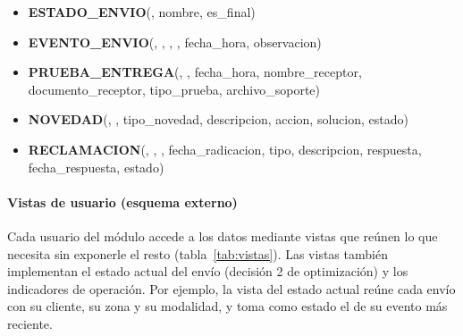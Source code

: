 {\begin{itemize}[leftmargin=0.6cm,itemsep=3pt,label={}]
  \item \textbf{ESTADO\_ENVIO}(, nombre, es\_final)
  \item \textbf{EVENTO\_ENVIO}(, , , , fecha\_hora, observacion)
  \item \textbf{PRUEBA\_ENTREGA}(, , fecha\_hora, nombre\_receptor, documento\_receptor, tipo\_prueba, archivo\_soporte)
  \item \textbf{NOVEDAD}(, , tipo\_novedad, descripcion, accion, solucion, estado)
  \item \textbf{RECLAMACION}(, , , fecha\_radicacion, tipo, descripcion, respuesta, fecha\_respuesta, estado)
\end{itemize}
\par}

\paragraph{Vistas de usuario (esquema externo)}

Cada usuario del módulo accede a los datos mediante vistas que reúnen lo
que necesita sin exponerle el resto (tabla~\ref{tab:vistas}). Las vistas
también implementan el estado actual del envío (decisión 2 de
optimización) y los indicadores de operación. Por ejemplo, la vista
del estado actual reúne cada envío con su cliente, su zona y su
modalidad, y toma como estado el de su evento más reciente.

